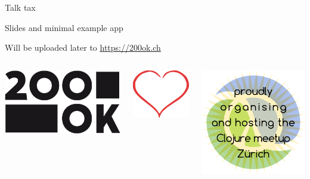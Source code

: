 \documentclass[bigger]{beamer}
\begin{document}
\begin{frame}[label=sec-4-1]{Talk tax}
\begin{block}{Slides and minimal example app}
\begin{block}{}
Will be uploaded later to \url{https://200ok.ch}
\end{block}

\begin{columns}
\begin{column}{0.30\textwidth}
\begin{block}{}
\includegraphics[height=0.25\textheight]{images/Logo_200ok.png}
\end{block}
\end{column}


\begin{column}{0.15\textwidth}
\begin{block}{}
\includegraphics[height=0.25\textheight]{images/heart.png}
\end{block}
\end{column}


\begin{column}{0.15\textwidth}
\begin{block}{}
\includegraphics[height=0.25\textheight]{images/clojure_sun.pdf}
\end{block}
\end{column}
\end{columns}
\end{block}
\end{frame}
\end{document}
